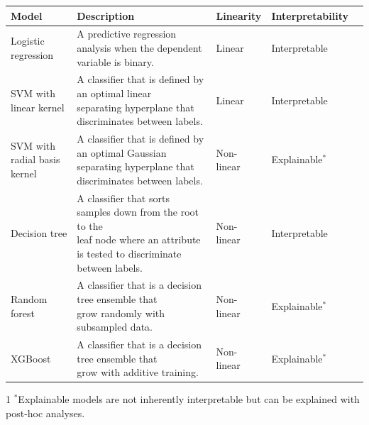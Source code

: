 \documentclass[11pt,]{article}
\begin{document}
\begin{tabular}{|l|l|l|l|l|}
\hline

\rowcolor{lightgray}
\textbf{Model} & \textbf{Description} & \textbf{Linearity} & \textbf{Interpretability} \\ \hline

\makecell[l]{Logistic \\regression} & \makecell[l]{A predictive regression analysis when the dependent \\variable is binary.} & Linear & Interpretable \\ \hline

\makecell[l]{SVM with \\linear kernel} & \makecell[l]{A classifier that is defined by an optimal linear \\separating hyperplane that discriminates between labels.} & Linear & Interpretable \\ \hline

\makecell[l]{SVM with \\radial basis kernel} & \makecell[l]{A classifier that is defined by an optimal Gaussian \\separating hyperplane that discriminates between labels.} & Non-linear & Explainable$^*$ \\ \hline
Decision tree & \makecell[l]{A classifier that sorts samples down from the
root to the \\leaf node where an attribute is tested to discriminate \\between labels.} & Non-linear & Interpretable \\ \hline

Random forest & \makecell[l]{A classifier that is a decision tree ensemble that \\grow randomly with subsampled data.} & Non-linear & Explainable$^*$ \\ \hline

XGBoost & \makecell[l]{A classifier that is a decision tree ensemble that \\grow with additive training.} & Non-linear & Explainable$^*$ \\ \hline

\end{tabular}\begin{tablenotes}\footnotesize
\item[1]{$^*$Explainable models are not inherently interpretable but can be explained with post-hoc analyses.}
\end{tablenotes}\newpage
\end{document}
